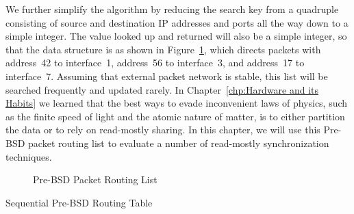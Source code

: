 We further simplify the algorithm by reducing the search key from
a quadruple consisting of source and destination IP addresses and
ports all the way down to a simple integer.
The value looked up and returned will also be a simple integer,
so that the data structure is as shown in
Figure~\ref{fig:defer:Pre-BSD Packet Routing List}, which
directs packets with address~42 to interface~1, address~56 to
interface~3, and address~17 to interface~7.
Assuming that external packet network is stable,
this list will be searched frequently and updated rarely.
In Chapter~\ref{chp:Hardware and its Habits}
we learned that the best ways to evade inconvenient laws of physics, such as
the finite speed of light and the atomic nature of matter, is to
either partition the data or to rely on read-mostly sharing.
In this chapter, we will use this Pre-BSD packet routing
list to evaluate a number of read-mostly synchronization techniques.

\begin{figure}[tb]
\centering
{}
\caption{Pre-BSD Packet Routing List}
\label{fig:defer:Pre-BSD Packet Routing List}
\end{figure}

\begin{listing}[tb]

\caption{Sequential Pre-BSD Routing Table}
\label{lst:defer:Sequential Pre-BSD Routing Table}
\end{listing}

